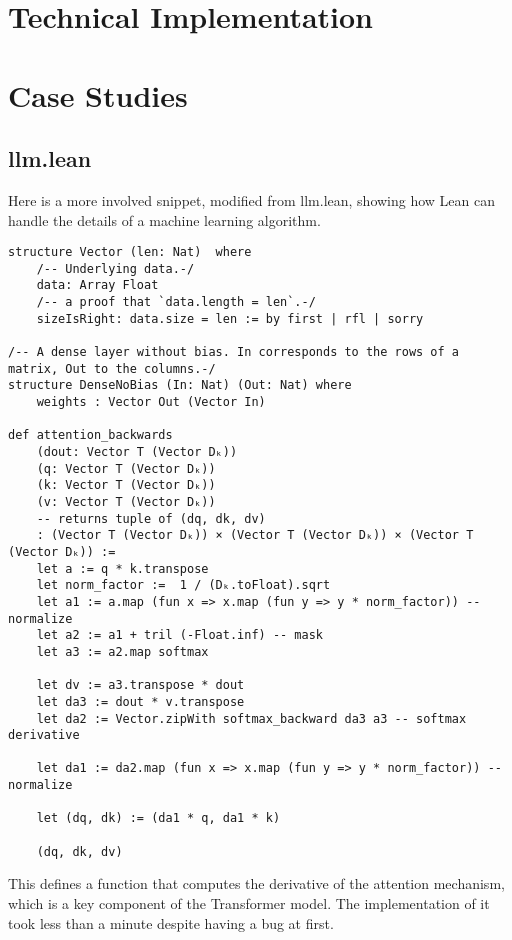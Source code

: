 \documentclass{article}
\begin{document}
\section{Technical Implementation}

\section{Case Studies}
\subsection{llm.lean}
Here is a more involved snippet, modified from llm.lean, showing how Lean can handle the details of a machine learning algorithm. 

\begin{verbatim}
structure Vector (len: Nat)  where
    /-- Underlying data.-/
    data: Array Float
    /-- a proof that `data.length = len`.-/
    sizeIsRight: data.size = len := by first | rfl | sorry

/-- A dense layer without bias. In corresponds to the rows of a matrix, Out to the columns.-/
structure DenseNoBias (In: Nat) (Out: Nat) where
    weights : Vector Out (Vector In)

def attention_backwards
    (dout: Vector T (Vector Dₖ))
    (q: Vector T (Vector Dₖ))
    (k: Vector T (Vector Dₖ))
    (v: Vector T (Vector Dₖ))
    -- returns tuple of (dq, dk, dv)
    : (Vector T (Vector Dₖ)) × (Vector T (Vector Dₖ)) × (Vector T (Vector Dₖ)) :=
    let a := q * k.transpose
    let norm_factor :=  1 / (Dₖ.toFloat).sqrt
    let a1 := a.map (fun x => x.map (fun y => y * norm_factor)) -- normalize
    let a2 := a1 + tril (-Float.inf) -- mask
    let a3 := a2.map softmax

    let dv := a3.transpose * dout
    let da3 := dout * v.transpose
    let da2 := Vector.zipWith softmax_backward da3 a3 -- softmax derivative

    let da1 := da2.map (fun x => x.map (fun y => y * norm_factor)) -- normalize

    let (dq, dk) := (da1 * q, da1 * k)

    (dq, dk, dv)
\end{verbatim}

This defines a function that computes the derivative of the attention mechanism, which is a key component of the Transformer model. The implementation of it took less than a minute despite having a bug at first.
\end{document}
